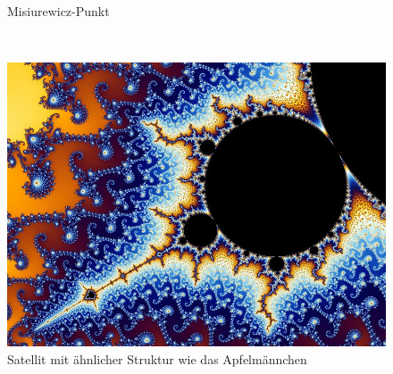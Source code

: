 \begin{figure}[H]
\begin{minipage}[t]{0.40\textwidth}
    \vspace*{-4ex}
    \caption{Misiurewicz-Punkt~\cite{beyer_partial_2005-3}}
    \label{app:6.4}
  \end{minipage}
  \\[4ex]
  \begin{minipage}[t]{\textwidth}
    \centering
    \includegraphics[width=0.45\linewidth]{images/zoom/800px-Mandel_zoom_08_satellite_antenna}
    \vspace*{-2ex}
    \caption{Satellit mit ähnlicher Struktur wie das Apfelm\"annchen~\cite{beyer_partial_2005-4}}
    \label{app:6.5}
  \end{minipage}
\end{figure}